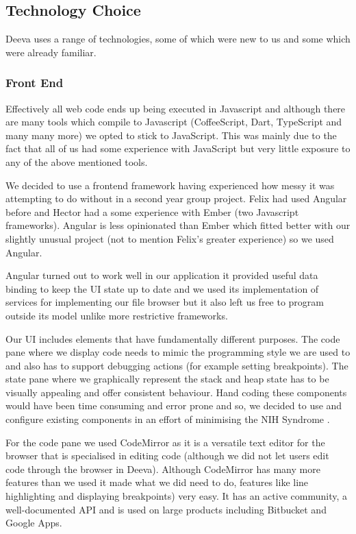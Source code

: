 \documentclass[11pt, a4paper]{article}
\begin{document}
\subsection{Technology Choice}
Deeva uses a range of technologies, some of which were new to us and some which were already familiar.

\subsubsection{Front End}
Effectively all web code ends up being executed in Javascript and although there are many tools which compile to Javascript (CoffeeScript, Dart, TypeScript and many many more) we opted to stick to JavaScript.
This was mainly due to the fact that all of us had some experience with JavaScript but very little exposure to any of the above mentioned tools.

We decided to use a frontend framework having experienced how messy it was attempting to do without in a second year group project.
Felix had used Angular before and Hector had a some experience with Ember (two Javascript frameworks).
Angular is less opinionated than Ember which fitted better with our slightly unusual project (not to mention Felix's greater experience) so we used Angular.

Angular turned out to work well in our application it provided useful data binding to keep the UI state up to date and we used its implementation of services for implementing our file browser but it also left us free to program outside its model unlike more restrictive frameworks.

Our UI includes elements that have fundamentally different purposes.
The code pane where we display code needs to mimic the programming style we are used to and also has to support debugging actions (for example setting breakpoints).
The state pane where we graphically represent the stack and heap state has to be visually appealing and offer consistent behaviour.
Hand coding these components would have been time consuming and error prone and so, we decided to use and configure existing components in an effort of minimising the NIH Syndrome \cite{NIH}.

For the code pane we used CodeMirror\cite{CodeMirror} as it is a versatile text editor for the browser that is specialised in editing code (although we did not let users edit code through the browser in Deeva).
Although CodeMirror has many more features than we used it made what we did need to do, features like line highlighting and displaying breakpoints) very easy.
It has an active community, a well-documented API and is used on large products including Bitbucket and Google Apps.
\end{document}
